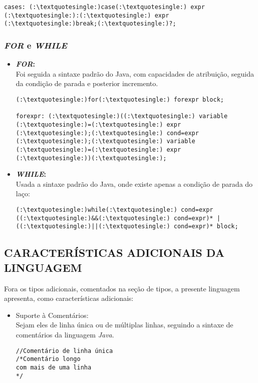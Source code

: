 \begin{itemize}
\begin{itemize}
\begin{lstlisting}
cases: (:\textquotesingle:)case(:\textquotesingle:) expr (:\textquotesingle:):(:\textquotesingle:) expr (:\textquotesingle:)break;(:\textquotesingle:)?;
        				\end{lstlisting}
        		\end{itemize}
        
        \subsubsection{\normalsize \textit{FOR} e \textit{WHILE}}
        		\begin{itemize}
        			\item \textbf{\textit{FOR}:}\\
        				Foi seguida a sintaxe padrão do Java, com capacidades de atribuição, seguida da condição de parada e posterior incremento.
        				
        				\begin{lstlisting}
(:\textquotesingle:)for(:\textquotesingle:) forexpr block;

forexpr: (:\textquotesingle:)((:\textquotesingle:) variable (:\textquotesingle:)=(:\textquotesingle:) expr (:\textquotesingle:);(:\textquotesingle:) cond=expr (:\textquotesingle:);(:\textquotesingle:) variable (:\textquotesingle:)=(:\textquotesingle:) expr (:\textquotesingle:))(:\textquotesingle:);
        				\end{lstlisting}
        				
        			\item \textbf{\textit{WHILE}:}\\
        				Usada a sintaxe padrão do Java, onde existe apenas a condição de parada do laço:
        				\begin{lstlisting}
(:\textquotesingle:)while(:\textquotesingle:) cond=expr ((:\textquotesingle:)&&(:\textquotesingle:) cond=expr)* | ((:\textquotesingle:)||(:\textquotesingle:) cond=expr)* block;
        				\end{lstlisting}
        		\end{itemize}

	\subsection{\normalsize CARACTERÍSTICAS ADICIONAIS DA LINGUAGEM}
            Fora os tipos adicionais, comentados na seção de tipos, a presente linguagem apresenta, como características adicionais:
			
			\begin{itemize}
				\item Suporte à Comentários:\\
					Sejam eles de linha única ou de múltiplas linhas, seguindo a sintaxe de comentários da linguagem \textit{Java}.
					\begin{lstlisting}
//Comentário de linha única
/*Comentário longo
com mais de uma linha
*/
					\end{lstlisting}


\end{itemize}
\end{itemize}

